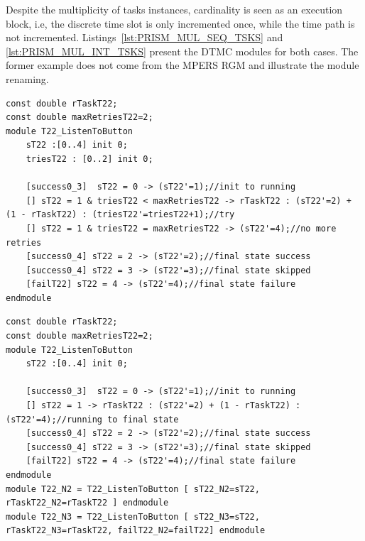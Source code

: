Despite the multiplicity of tasks instances, cardinality is seen as an execution block, i.e, the discrete time slot is only incremented once, while the time path is not incremented. Listings~\ref{lst:PRISM_MUL_SEQ_TSKS} and \ref{lst:PRISM_MUL_INT_TSKS} present the DTMC modules for both cases. The former example does not come from the MPERS RGM and illustrate the module renaming.
\medskip

\begin{lstlisting}[language=Prism, caption={Sequential cardinality with n=2 for task T22.},label={lst:PRISM_MUL_SEQ_TSKS}] 
const double rTaskT22;
const double maxRetriesT22=2;
module T22_ListenToButton
	sT22 :[0..4] init 0;
	triesT22 : [0..2] init 0;	
	
	[success0_3]  sT22 = 0 -> (sT22'=1);//init to running
	[] sT22 = 1 & triesT22 < maxRetriesT22 -> rTaskT22 : (sT22'=2) + (1 - rTaskT22) : (triesT22'=triesT22+1);//try
	[] sT22 = 1 & triesT22 = maxRetriesT22 -> (sT22'=4);//no more retries
	[success0_4] sT22 = 2 -> (sT22'=2);//final state success
	[success0_4] sT22 = 3 -> (sT22'=3);//final state skipped
	[failT22] sT22 = 4 -> (sT22'=4);//final state failure
endmodule
\end{lstlisting}
\medskip

\begin{lstlisting}[language=Prism, caption={Interleaved cardinality with n=3 for task T22.},label={lst:PRISM_MUL_INT_TSKS}] 
const double rTaskT22;
const double maxRetriesT22=2;
module T22_ListenToButton
	sT22 :[0..4] init 0;
	
	[success0_3]  sT22 = 0 -> (sT22'=1);//init to running
	[] sT22 = 1 -> rTaskT22 : (sT22'=2) + (1 - rTaskT22) : (sT22'=4);//running to final state
	[success0_4] sT22 = 2 -> (sT22'=2);//final state success
	[success0_4] sT22 = 3 -> (sT22'=3);//final state skipped
	[failT22] sT22 = 4 -> (sT22'=4);//final state failure
endmodule
module T22_N2 = T22_ListenToButton [ sT22_N2=sT22, rTaskT22_N2=rTaskT22 ] endmodule
module T22_N3 = T22_ListenToButton [ sT22_N3=sT22, rTaskT22_N3=rTaskT22, failT22_N2=failT22] endmodule
\end{lstlisting}



